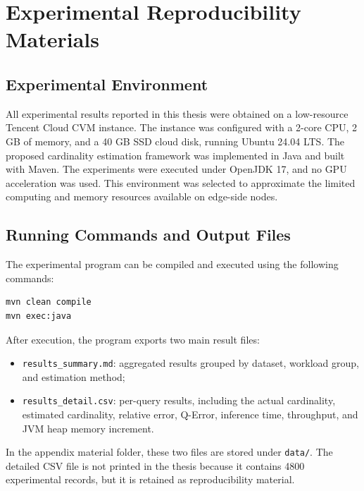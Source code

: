 
\chapter{Experimental Reproducibility Materials}

\section{Experimental Environment}

All experimental results reported in this thesis were obtained on a low-resource
Tencent Cloud CVM instance. The instance was configured with a 2-core CPU, 2 GB
of memory, and a 40 GB SSD cloud disk, running Ubuntu 24.04 LTS. The proposed
cardinality estimation framework was implemented in Java and built with Maven.
The experiments were executed under OpenJDK 17, and no GPU acceleration was used.
This environment was selected to approximate the limited computing and memory
resources available on edge-side nodes.

\section{Running Commands and Output Files}

The experimental program can be compiled and executed using the following
commands:

\begin{lstlisting}[language=bash]
mvn clean compile
mvn exec:java
\end{lstlisting}

After execution, the program exports two main result files:

\begin{itemize}
    \item \texttt{results\_summary.md}: aggregated results grouped by dataset,
    workload group, and estimation method;
    \item \texttt{results\_detail.csv}: per-query results, including the actual
    cardinality, estimated cardinality, relative error, Q-Error, inference time,
    throughput, and JVM heap memory increment.
\end{itemize}

In the appendix material folder, these two files are stored under
\texttt{data/}. The detailed CSV file is not printed in the thesis because it
contains 4800 experimental records, but it is retained as reproducibility
material.

